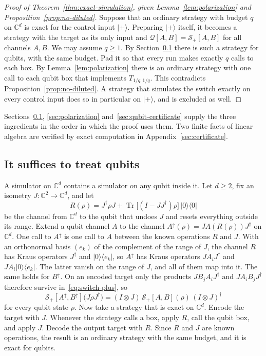 \documentclass[11pt,letterpaper]{article}
\theoremstyle{definition}\newtheorem{definition}[theorem]{Definition}
\newcommand{\C}{\mathbb C}
\newcommand{\Tr}{\operatorname{Tr}}
\newcommand{\ket}[1]{\lvert#1\rangle}
\newcommand{\bra}[1]{\langle#1\rvert}
\newcommand{\proj}[1]{\ket{#1}\!\bra{#1}}
\newcommand{\SW}{\mathcal S}
\newcommand{\QC}{\mathcal Q}
\begin{document}
\begin{proof}[Proof of Theorem~\ref{thm:exact-simulation}, given Lemma~\ref{lem:polarization} and Proposition~\ref{prop:no-diluted}]
Suppose that an ordinary strategy with budget $q$ on $\C^d$ is exact
for the control input $\ket+$. Preparing $\ket+$ itself, it becomes a
strategy with the target as its only input and
$\QC[A,B]=\SW_+[A,B]$ for all channels $A,B$. We may assume $q\ge1$. By
Section~\ref{sec:embedding} there is such a strategy for qubits, with
the same budget. Pad it so that every run makes exactly $q$ calls to
each box. By Lemma~\ref{lem:polarization} there is an ordinary strategy
with one call to each qubit box that implements $T_{1/q,1/q}$. This
contradicts Proposition~\ref{prop:no-diluted}. A strategy that
simulates the switch exactly on every control input does so in
particular on $\ket+$, and is excluded as well.
\end{proof}

Sections~\ref{sec:embedding}, \ref{sec:polarization}
and~\ref{sec:qubit-certificate} supply the three ingredients in the
order in which the proof uses them. Two finite facts of linear algebra
are verified by exact computation in Appendix~\ref{sec:certificate}.


\subsection{It suffices to treat qubits}\label{sec:embedding}

A simulator on $\C^d$ contains a simulator on any qubit inside it.
Let $d\ge2$, fix an isometry $J:\C^2\to\C^d$, and let
\[
 R(\rho)=J^\dagger\rho J+\Tr\bigl[(I-JJ^\dagger)\rho\bigr]\,\proj0
\]
be the channel from $\C^d$ to the qubit that undoes $J$ and resets
everything outside its range. Extend a qubit channel $A$ to the channel
$A^\uparrow(\rho)=JA(R(\rho))J^\dagger$ on $\C^d$. One call to
$A^\uparrow$ is one call to $A$ between the known operations $R$ and
$J$. With an orthonormal basis $(e_k)$ of the complement of the range
of $J$, the channel $R$ has Kraus operators $J^\dagger$ and
$\ket0\!\bra{e_k}$, so $A^\uparrow$ has Kraus operators
$JA_iJ^\dagger$ and $JA_i\ket0\!\bra{e_k}$. The latter vanish on the
range of $J$, and all of them map into it. The same holds for
$B^\uparrow$.
On an encoded target only the products $JB_jA_iJ^\dagger$ and
$JA_iB_jJ^\dagger$ therefore survive in~\eqref{eq:switch-plus}, so
\[
 \SW_+[A^\uparrow,B^\uparrow]\bigl(J\rho J^\dagger\bigr)
 =(I\otimes J)\,\SW_+[A,B](\rho)\,(I\otimes J)^\dagger
\]
for every qubit state $\rho$. Now take a strategy that is exact on
$\C^d$. Encode the target with $J$. Whenever the strategy calls a box, apply
$R$, call the qubit box, and apply $J$. Decode the output target with
$R$. Since $R$ and $J$ are known operations, the
result is an ordinary strategy with the same budget, and it is exact
for qubits.
\end{document}
